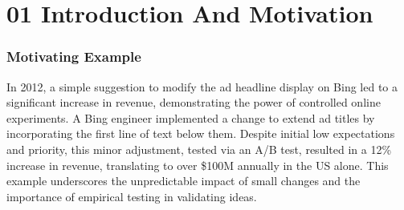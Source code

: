 \documentclass{article}
\begin{document}
\section*{01 Introduction And Motivation}
\subsubsection*{Motivating Example}
In 2012, a simple suggestion to modify the ad headline display on Bing led to a significant increase in revenue, demonstrating the power of controlled online experiments. A Bing engineer implemented a change to extend ad titles by incorporating the first line of text below them. Despite initial low expectations and priority, this minor adjustment, tested via an A/B test, resulted in a 12\% increase in revenue, translating to over \$100M annually in the US alone. This example underscores the unpredictable impact of small changes and the importance of empirical testing in validating ideas.
\end{document}
